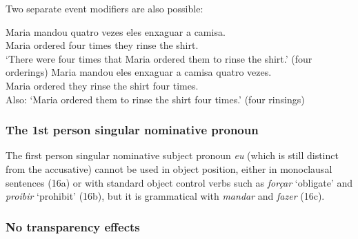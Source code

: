 \documentclass[output=paper]{langsci/langscibook}
\begin{document}
Two separate event modifiers are also possible:

\ea%
    \label{ex:moreno:15}
    \ea
    \gll Maria mandou   quatro vezes  eles enxaguar   a camisa.\\
         Maria ordered    four    times  they rinse   the shirt.\\
    \glt ‘There were four times that Maria ordered them to rinse the shirt.’ (four orderings)
    \ex  
    \gll Maria mandou eles   enxaguar   a camisa   quatro vezes.\\
         Maria ordered they   rinse     the shirt  four times.\\
    \glt Also: ‘Maria ordered them to rinse the shirt four times.’ (four rinsings)
    \z
\z

\subsubsection{The 1st person singular nominative pronoun}%

The first person singular nominative subject pronoun \textit{eu} (which is still distinct from the accusative) cannot be used in object position, either in monoclausal sentences (16a) or with standard object control verbs such as \textit{forçar} ‘obligate’ and \textit{proibir} ‘prohibit’ (16b), but it is grammatical with \textit{mandar} and \textit{fazer} (16c). 

\ea%
    \label{ex:moreno:16}
    \z
\z

\subsubsection{No transparency effects}%
\end{document}
